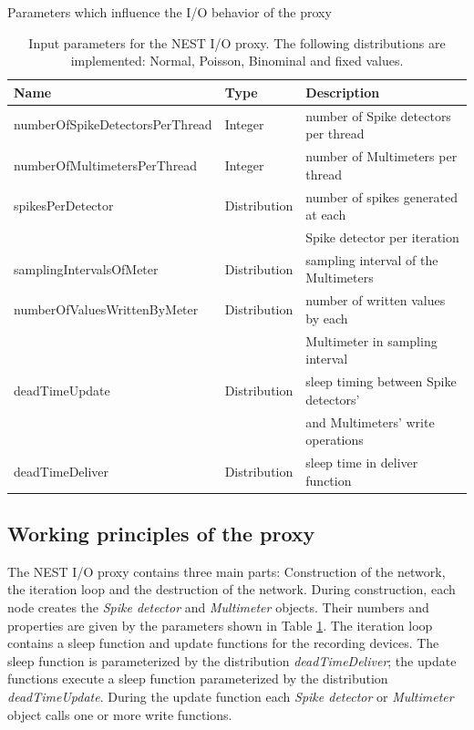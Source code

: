 \documentclass[]{YIC2015}
\begin{document}
\begin{table}[b]
\caption{Parameters which influence the I/O behavior of the proxy}
\centering
\begin{tabular}{lll}
\hline\hline
\textbf{Name}                   & \textbf{Type} & \textbf{Description} \\ \hline
numberOfSpikeDetectorsPerThread & Integer       & number of Spike detectors per thread  \\
numberOfMultimetersPerThread    & Integer       & number of Multimeters per thread  \\
spikesPerDetector               & Distribution  & number of spikes generated at each \\
        &           & Spike detector per iteration  \\
samplingIntervalsOfMeter        & Distribution  & sampling interval of the Multimeters  \\
numberOfValuesWrittenByMeter    & Distribution  & number of written values by each \\
        &           & Multimeter in sampling interval  \\
deadTimeUpdate                  & Distribution  & sleep timing between Spike detectors' \\
        &           & and Multimeters' write operations \\
deadTimeDeliver                 & Distribution  & sleep time in deliver function  \\
\hline\hline
\end{tabular}
\label{tab:table-silva1}
\caption{Input parameters for the NEST I/O proxy. The following distributions
  are implemented: Normal, Poisson, Binominal and fixed values.}
\end{table}

\subsection{Working principles of the proxy}

The NEST I/O proxy contains three main parts: Construction of the
network, the iteration loop and the destruction of the network. During
construction, each node creates the \emph{Spike detector} and
\emph{Multimeter} objects. Their numbers and properties are given by
the parameters shown in Table \ref{tab:table-silva1}. The iteration
loop contains a sleep function and update functions for the recording
devices. The sleep function is parameterized by the distribution
\emph{deadTimeDeliver}; the update functions execute a sleep function
parameterized by the distribution \emph{deadTimeUpdate}. During the
update function each \emph{Spike detector} or \emph{Multimeter} object
calls one or more write functions.
\end{document}
